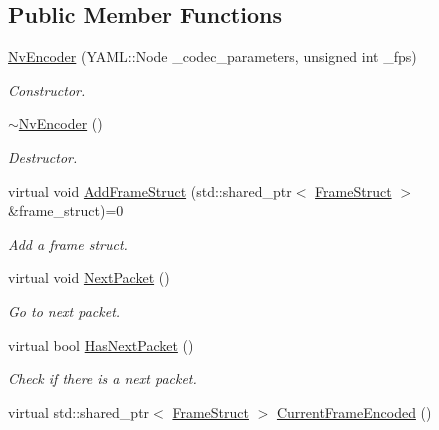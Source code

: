 \subsection*{Public Member Functions}
\begin{DoxyCompactItemize}
\item 
\hyperlink{classmoetsi_1_1ssp_1_1NvEncoder_aab4a3ce1729dba51183b77adcc78aa5e}{Nv\+Encoder} (Y\+A\+M\+L\+::\+Node \+\_\+codec\+\_\+parameters, unsigned int \+\_\+fps)
\begin{DoxyCompactList}\small\item\em Constructor. \end{DoxyCompactList}\item 
\mbox{\label{classmoetsi_1_1ssp_1_1NvEncoder_a1ae3ff63a16da6e5e169684becbb02ed}} 
\hyperlink{classmoetsi_1_1ssp_1_1NvEncoder_a1ae3ff63a16da6e5e169684becbb02ed}{$\sim$\+Nv\+Encoder} ()
\begin{DoxyCompactList}\small\item\em Destructor. \end{DoxyCompactList}\item 
virtual void \hyperlink{classmoetsi_1_1ssp_1_1NvEncoder_a99fbcbd5f04c5b3b395167badbf84b2f}{Add\+Frame\+Struct} (std\+::shared\+\_\+ptr$<$ \hyperlink{structmoetsi_1_1ssp_1_1FrameStruct}{Frame\+Struct} $>$ \&frame\+\_\+struct)=0
\begin{DoxyCompactList}\small\item\em Add a frame struct. \end{DoxyCompactList}\item 
\mbox{\label{classmoetsi_1_1ssp_1_1NvEncoder_a1c6d801fbb40e7dea2b33dd2ac154919}} 
virtual void \hyperlink{classmoetsi_1_1ssp_1_1NvEncoder_a1c6d801fbb40e7dea2b33dd2ac154919}{Next\+Packet} ()
\begin{DoxyCompactList}\small\item\em Go to next packet. \end{DoxyCompactList}\item 
virtual bool \hyperlink{classmoetsi_1_1ssp_1_1NvEncoder_a4c0874d9d0d767ae7a33fe9c9a1be1de}{Has\+Next\+Packet} ()
\begin{DoxyCompactList}\small\item\em Check if there is a next packet. \end{DoxyCompactList}\item 
virtual std\+::shared\+\_\+ptr$<$ \hyperlink{structmoetsi_1_1ssp_1_1FrameStruct}{Frame\+Struct} $>$ \hyperlink{classmoetsi_1_1ssp_1_1NvEncoder_adbc7d498e797af8c5bb31b5a2a82efdd}{Current\+Frame\+Encoded} ()

\end{DoxyCompactItemize}
